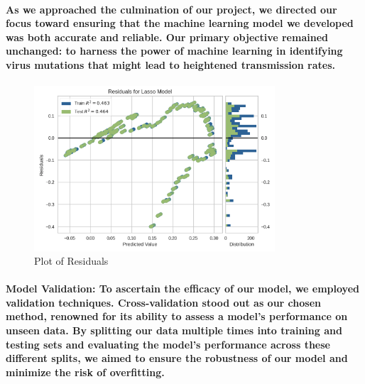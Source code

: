 \documentclass{article}
\begin{document}
\paragraph{\textbf{}}
\paragraph{As we approached the culmination of our project, we directed our focus toward ensuring that the machine learning model we developed was both accurate and reliable. Our primary objective remained unchanged: to harness the power of machine learning in identifying virus mutations that might lead to heightened transmission rates.}
\paragraph{\textbf{}}
\begin{figure}[h]
    \centering
    \includegraphics[width=0.8\textwidth]{residuals.png} 
    \caption{Plot of Residuals}
    \label{fig:my_label_7}
\end{figure}
\paragraph{\textbf{}}
\paragraph{\textbf{Model Validation}: To ascertain the efficacy of our model, we employed validation techniques. Cross-validation stood out as our chosen method, renowned for its ability to assess a model's performance on unseen data. By splitting our data multiple times into training and testing sets and evaluating the model's performance across these different splits, we aimed to ensure the robustness of our model and minimize the risk of overfitting.}
\end{document}
